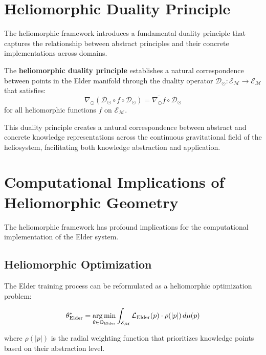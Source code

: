 \section{Heliomorphic Duality Principle}

The heliomorphic framework introduces a fundamental duality principle that captures the relationship between abstract principles and their concrete implementations across domains.

\begin{definition}
The \textbf{heliomorphic duality principle} establishes a natural correspondence between points in the Elder manifold through the duality operator $\mathcal{D}_{\odot}: \mathcal{E}_{\mathcal{M}} \rightarrow \mathcal{E}_{\mathcal{M}}$ that satisfies:
\begin{equation}
\nabla_{\odot} (\mathcal{D}_{\odot} \circ f \circ \mathcal{D}_{\odot}) = \overline{\nabla_{\odot} f} \circ \mathcal{D}_{\odot}
\end{equation}
for all heliomorphic functions $f$ on $\mathcal{E}_{\mathcal{M}}$.
\end{definition}

This duality principle creates a natural correspondence between abstract and concrete knowledge representations across the continuous gravitational field of the heliosystem, facilitating both knowledge abstraction and application.

\section{Computational Implications of Heliomorphic Geometry}

The heliomorphic framework has profound implications for the computational implementation of the Elder system.

\subsection{Heliomorphic Optimization}

The Elder training process can be reformulated as a heliomorphic optimization problem:

\begin{equation}
\theta_{\text{Elder}}^* = \mathop{\mathrm{arg\,min}}_{\theta \in \Theta_{\text{Elder}}} \int_{\mathcal{E}_{\mathcal{M}}} \mathcal{L}_{\text{Elder}}(p) \cdot \rho(|p|) \, d\mu(p)
\end{equation}

where $\rho(|p|)$ is the radial weighting function that prioritizes knowledge points based on their abstraction level.

